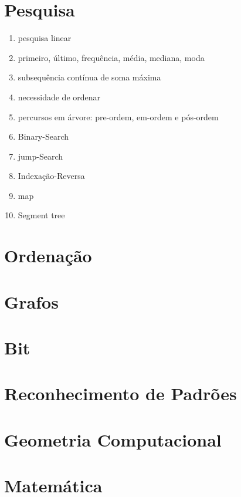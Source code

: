 \section*{Pesquisa}
\begin{enumerate}
	\item{pesquisa linear}
	\item{primeiro, último, frequência, média, mediana, moda} 
	\item subsequência contínua de soma máxima
	\item necessidade de ordenar
	\item percursos em árvore: pre-ordem, em-ordem e pós-ordem
	\item Binary-Search
	\item jump-Search
	\item Indexação-Reversa
	\item map
	\item Segment tree
\end{enumerate}

\section*{Ordenação}
\section*{Grafos}
\section*{Bit}
\section*{Reconhecimento de Padrões}
\section*{Geometria Computacional}
\section*{Matemática}